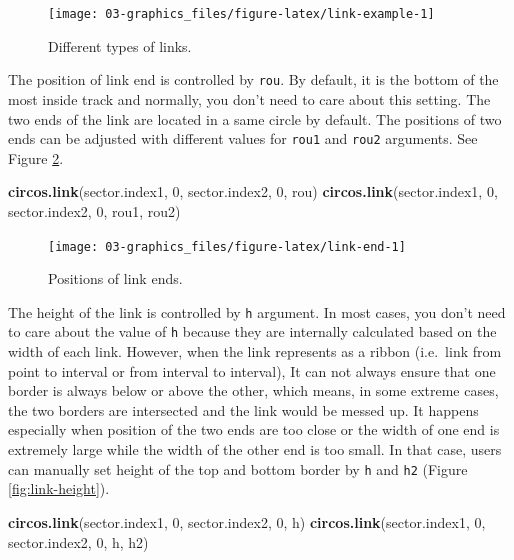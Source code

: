 \documentclass[]{book}
\newenvironment{Shaded}{\begin{snugshade}}{\end{snugshade}}
\newcommand{\KeywordTok}[1]{\textcolor[rgb]{0.13,0.29,0.53}{\textbf{#1}}}
\newcommand{\DecValTok}[1]{\textcolor[rgb]{0.00,0.00,0.81}{#1}}
\newcommand{\NormalTok}[1]{#1}
\theoremstyle{definition}
\theoremstyle{definition}
\theoremstyle{remark}
\begin{document}
\begin{figure}

{\centering \texttt{[image: 03-graphics\_files/figure-latex/link-example-1]} 

}

\caption{Different types of links.}\label{fig:link-example}
\end{figure}

The position of link end is controlled by \texttt{rou}. By default, it
is the bottom of the most inside track and normally, you don't need to
care about this setting. The two ends of the link are located in a same
circle by default. The positions of two ends can be adjusted with
different values for \texttt{rou1} and \texttt{rou2} arguments. See
Figure \ref{fig:link-end}.

\begin{Shaded}
\begin{Highlighting}[]
\KeywordTok{circos.link}\NormalTok{(sector.index1, }\DecValTok{0}\NormalTok{, sector.index2, }\DecValTok{0}\NormalTok{, rou)}
\KeywordTok{circos.link}\NormalTok{(sector.index1, }\DecValTok{0}\NormalTok{, sector.index2, }\DecValTok{0}\NormalTok{, rou1, rou2)}
\end{Highlighting}
\end{Shaded}

\begin{figure}

{\centering \texttt{[image: 03-graphics\_files/figure-latex/link-end-1]} 

}

\caption{Positions of link ends.}\label{fig:link-end}
\end{figure}

The height of the link is controlled by \texttt{h} argument. In most
cases, you don't need to care about the value of \texttt{h} because they
are internally calculated based on the width of each link. However, when
the link represents as a ribbon (i.e.~link from point to interval or
from interval to interval), It can not always ensure that one border is
always below or above the other, which means, in some extreme cases, the
two borders are intersected and the link would be messed up. It happens
especially when position of the two ends are too close or the width of
one end is extremely large while the width of the other end is too
small. In that case, users can manually set height of the top and bottom
border by \texttt{h} and \texttt{h2} (Figure \ref{fig:link-height}).

\begin{Shaded}
\begin{Highlighting}[]
\KeywordTok{circos.link}\NormalTok{(sector.index1, }\DecValTok{0}\NormalTok{, sector.index2, }\DecValTok{0}\NormalTok{, h)}
\KeywordTok{circos.link}\NormalTok{(sector.index1, }\DecValTok{0}\NormalTok{, sector.index2, }\DecValTok{0}\NormalTok{, h, h2)}
\end{Highlighting}
\end{Shaded}
\end{document}
